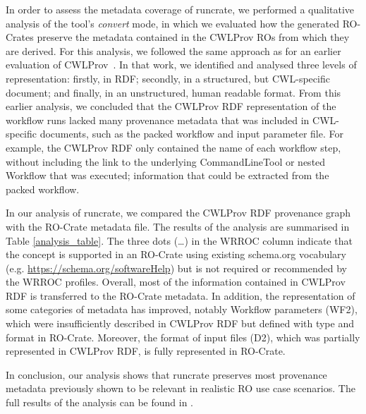 \documentclass[10pt,letterpaper]{article}
\begin{document}
In order to assess the metadata coverage of runcrate, we performed a qualitative analysis of the tool's \emph{convert} mode, in which we evaluated how the generated RO-Crates preserve the metadata contained in the CWLProv ROs from which they are derived.
For this analysis, we followed the same approach as for an earlier evaluation of CWLProv~\cite{De Wit 2022}.
In that work, we identified and analysed three levels of representation:
firstly, in RDF; secondly, in a structured, but CWL-specific document;
and finally, in an unstructured, human readable format.
From this earlier analysis, we concluded that the CWLProv RDF representation of the workflow runs lacked many provenance metadata that was included in CWL-specific documents, such as the packed workflow and input parameter file.
For example, the CWLProv RDF only contained the name of each workflow step, without including the link to the underlying CommandLineTool or nested Workflow that was executed; information that could be extracted from the packed workflow.

In our analysis of runcrate, we compared the CWLProv RDF provenance graph with the RO-Crate metadata file. The results of the analysis are summarised in Table
\ref{analysis_table}.
The three dots (…) in the WRROC column indicate that  the concept is supported in an RO-Crate using existing schema.org vocabulary (e.g. \url{https://schema.org/softwareHelp}) but is not required or recommended by the WRROC profiles.
Overall, most of the information contained in CWLProv RDF is transferred to the RO-Crate metadata.
In addition, the representation of some categories of metadata has improved, notably Workflow parameters (WF2), which were insufficiently described in CWLProv RDF but defined with type and format in RO-Crate.
Moreover, the format of input files (D2), which was partially represented in CWLProv RDF, is fully represented in RO-Crate.

In conclusion, our analysis shows that runcrate preserves most provenance metadata previously shown to be relevant in realistic RO use case scenarios.
The full results of the analysis can be found in \cite{de Wit 2023}.
\end{document}
